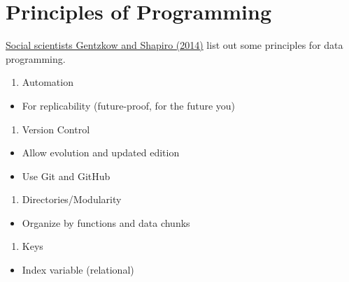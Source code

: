 \documentclass[]{book}
\providecommand{\tightlist}{%
  \setlength{\itemsep}{0pt}\setlength{\parskip}{0pt}}
\begin{document}
\hypertarget{principles-of-programming}{%
\section{Principles of Programming}\label{principles-of-programming}}

\href{http://home.bi.no/charlotte.ostergaard/students/CodeAndData.pdf}{Social scientists Gentzkow and Shapiro (2014)} list out some principles for data programming.

\begin{enumerate}
\def\labelenumi{\arabic{enumi}.}
\tightlist
\item
  Automation
\end{enumerate}

\begin{itemize}
\tightlist
\item
  For replicability (future-proof, for the future you)
\end{itemize}

\begin{enumerate}
\def\labelenumi{\arabic{enumi}.}
\setcounter{enumi}{1}
\tightlist
\item
  Version Control
\end{enumerate}

\begin{itemize}
\tightlist
\item
  Allow evolution and updated edition
\item
  Use Git and GitHub
\end{itemize}

\begin{enumerate}
\def\labelenumi{\arabic{enumi}.}
\setcounter{enumi}{2}
\tightlist
\item
  Directories/Modularity
\end{enumerate}

\begin{itemize}
\tightlist
\item
  Organize by functions and data chunks
\end{itemize}

\begin{enumerate}
\def\labelenumi{\arabic{enumi}.}
\setcounter{enumi}{3}
\tightlist
\item
  Keys
\end{enumerate}

\begin{itemize}
\tightlist
\item
  Index variable (relational)
\end{itemize}
\end{document}
